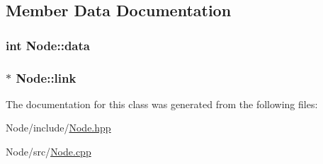 \subsection{\-Member \-Data \-Documentation}
\hypertarget{classNode_a87c003c9f600e3fc58e6e90835f0b605}{
\subsubsection[{data}]{\setlength{\rightskip}{0pt plus 5cm}int {\bf \-Node\-::data}}}\label{classNode_a87c003c9f600e3fc58e6e90835f0b605}
\hypertarget{classNode_a44bb6f65459bbec0064fad001706d242}{
\subsubsection[{link}]{$\ast$ {\bf \-Node\-::link}}}\label{classNode_a44bb6f65459bbec0064fad001706d242}


\-The documentation for this class was generated from the following files\-:\begin{DoxyCompactItemize}
\item 
\-Node/include/\hyperlink{Node_8hpp}{\-Node.\-hpp}\item 
\-Node/src/\hyperlink{Node_8cpp}{\-Node.\-cpp}\end{DoxyCompactItemize}
